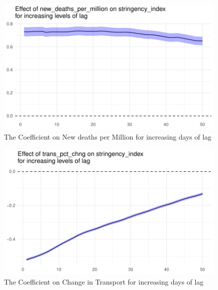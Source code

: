 \documentclass[
  11pt,
]{article}
\begin{document}
\begin{figure}
\includegraphics[width=0.8\linewidth]{write_up_test_files/figure-latex/lag-deaths-1} \caption{The Coefficient on New deaths per Million for increasing days of lag}\label{fig:lag-deaths}
\end{figure}

\begin{figure}
\includegraphics[width=0.8\linewidth]{write_up_test_files/figure-latex/lag-trans-1} \caption{The Coefficient on Change in Transport for increasing days of lag}\label{fig:lag-trans}
\end{figure}
\end{document}
